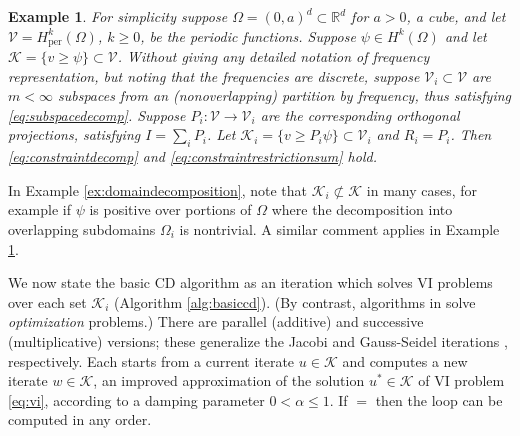 \documentclass[letterpaper,final,12pt,reqno]{amsart}
\theoremstyle{cstyle}
\theoremstyle{cstyle*}
\theoremstyle{dstyle}
\newtheorem{example}[theorem]{Example}
\numberwithin{equation}{section}
\numberwithin{figure}{section}
\numberwithin{table}{section}
\numberwithin{theorem}{section}
\newcommand{\RR}{\mathbb{R}}
\newcommand{\cK}{\mathcal{K}}
\newcommand{\cV}{\mathcal{V}}
\begin{document}
\begin{example}  \label{ex:frequencydecomposition}  For simplicity suppose $\Omega = (0,a)^d \subset \RR^d$ for $a>0$, a cube, and let $\cV = H_{\text{per}}^k(\Omega)$, $k\ge 0$, be the periodic functions.  Suppose $\psi \in H^k(\Omega)$ and let $\cK = \{v \ge \psi\} \subset \cV$.  Without giving any detailed notation of frequency representation, but noting that the frequencies are discrete, suppose $\cV_i \subset \cV$ are $m<\infty$ subspaces from an (nonoverlapping) partition by frequency, thus satisfying \eqref{eq:subspacedecomp}.  Suppose $P_i:\cV \to \cV_i$ are the corresponding orthogonal projections, satisfying $I = \sum_i P_i$.  Let $\cK_i = \{v \ge P_i \psi\} \subset \cV_i$ and $R_i = P_i$.  Then \eqref{eq:constraintdecomp} and \eqref{eq:constraintrestrictionsum} hold.
\end{example}

In Example \ref{ex:domaindecomposition}, note that $\cK_i \not\subset \cK$ in many cases, for example if $\psi$ is positive over portions of $\Omega$ where the decomposition into overlapping subdomains $\Omega_i$ is nontrivial.  A similar comment applies in Example \ref{ex:frequencydecomposition}.

We now state the basic CD algorithm as an iteration which solves VI problems over each set $\cK_i$ (Algorithm \ref{alg:basiccd}).  (By contrast, algorithms in \cite{Tai2003} solve \emph{optimization} problems.)  There are parallel (additive) and successive (multiplicative) versions; these generalize the Jacobi and Gauss-Seidel iterations \cite{Greenbaum1997}, respectively.  Each starts from a current iterate $u \in \cK$ and computes a new iterate $w\in\cK$, an improved approximation of the solution $u^* \in \cK$ of VI problem \eqref{eq:vi}, according to a damping parameter $0<\alpha\le 1$.  If  $=$  then the  loop can be computed in any order.
\end{document}
